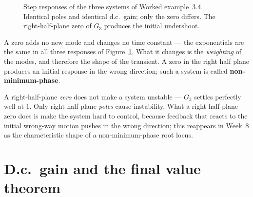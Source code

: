\documentclass[11pt,a4paper]{article}
\begin{document}
\begin{figure}[htbp]
\centering
{}
\caption{Step responses of the three systems of Worked example~3.4. Identical
poles and identical d.c.\ gain; only the zero differs. The right-half-plane
zero of $G_3$ produces the initial undershoot.}
\label{fig:zeros}
\end{figure}

\begin{keyidea}
A zero adds no new mode and changes no time constant --- the exponentials are
the same in all three responses of Figure~\ref{fig:zeros}. What it changes is
the \emph{weighting} of the modes, and therefore the shape of the transient. A
zero in the right half plane produces an initial response in the wrong
direction; such a system is called \textbf{non-minimum-phase}.
\end{keyidea}

\begin{pitfall}
A right-half-plane \emph{zero} does not make a system unstable --- $G_3$
settles perfectly well at $1$. Only right-half-plane \emph{poles} cause
instability. What a right-half-plane zero does is make the system hard to
control, because feedback that reacts to the initial wrong-way motion pushes in
the wrong direction; this reappears in Week~8 as the characteristic shape of a
non-minimum-phase root locus.
\end{pitfall}

\section{D.c.\ gain and the final value theorem}
\label{sec:dcgain}
\end{document}
